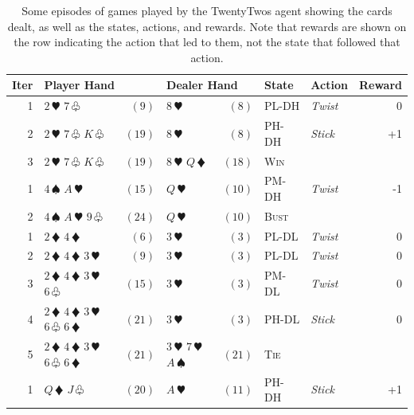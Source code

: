 \documentclass[xcolor={table}]{beamer}
\newcommand{\Toprule}[0]{\hline}
\newcommand{\Midrule}[0]{\hline}
\newcommand{\rlState}[1]{\textsc{#1}} %
\newcommand{\rlAction}[1]{\textit{#1}} %
\begin{document}
 \begin{frame} 
\begin{table}[!t]
\caption{Some episodes of games played by the TwentyTwos agent showing the cards dealt, as well as the states, actions, and rewards. Note that rewards are shown on the row indicating the action that led to them, not the state that followed that action.}
\label{table:blackjack_demo}
\begin{scriptsize}

{\setlength{\tabcolsep}{0.3em}
\begin{tabular*}{\textwidth}{@{\extracolsep{\fill}} rlrlrllr @{}}
\Toprule
Iter & \multicolumn{2}{l}{Player Hand} & \multicolumn{2}{l}{Dealer Hand} & State &  Action & Reward \\
\Midrule
1 & $2\,\varheart$ $7\,\varclub$ &  $(9)$ & $8\,\varheart$ & $(8)$ & \rlState{PL-DH} & \rlAction{Twist} &  0 \\
2 & $2\,\varheart$ $7\,\varclub$ $K\,\varclub$ & $(19)$ & $8\,\varheart$ & $(8)$ & \rlState{PH-DH} & \rlAction{Stick} &  +1 \\
3 & $2\,\varheart$ $7\,\varclub$ $K\,\varclub$ & $(19)$ & $8\,\varheart$ $Q\,\vardiamond$ & $(18)$ & \rlState{Win} & &  ~ \\
\Midrule
1 & $4\,\spadesuit$ $A\,\varheart$ &  $(15)$ & $Q\,\varheart$ & $(10)$ & \rlState{PM-DH} & \rlAction{Twist} &  -1 \\
2 & $4\,\spadesuit$ $A\,\varheart$ $9\,\varclub$ & $(24)$ & $Q\,\varheart$ & $(10)$ & \rlState{Bust} &  & $ ~$ \\
\Midrule
1 & $2\,\vardiamond$ $4\,\vardiamond$ &  $(6)$ & $3\,\varheart$ & $(3)$ & \rlState{PL-DL} & \rlAction{Twist} &  0 \\
2 & $2\,\vardiamond$ $4\,\vardiamond$  $3\,\varheart$&  $(9)$ & $3\,\varheart$ & $(3)$ & \rlState{PL-DL} & \rlAction{Twist} &  0 \\
3 & $2\,\vardiamond$ $4\,\vardiamond$  $3\,\varheart$ $6\,\varclub$ &  $(15)$ & $3\,\varheart$ & $(3)$ & \rlState{PM-DL} & \rlAction{Twist} &  0 \\
4 & $2\,\vardiamond$ $4\,\vardiamond$  $3\,\varheart$ $6\,\varclub$  $6\,\vardiamond$ &  $(21)$ & $3\,\varheart$ & $(3)$ & \rlState{PH-DL} & \rlAction{Stick} &  0 \\
5 & $2\,\vardiamond$ $4\,\vardiamond$  $3\,\varheart$ $6\,\varclub$  $6\,\vardiamond$ &  $(21)$ & $3\,\varheart$ $7\,\varheart$ $A\,\spadesuit$ & $(21)$ & \rlState{Tie} & ~ &  ~ \\
\Midrule
1 & $Q\,\vardiamond$ $J\,\varclub$ &  $(20)$ & $A\,\varheart$ & $(11)$ & \rlState{PH-DH} & \rlAction{Stick} &  +1 \\

\end{tabular*}}
\end{scriptsize}
\end{table}
\end{frame}
\end{document}
